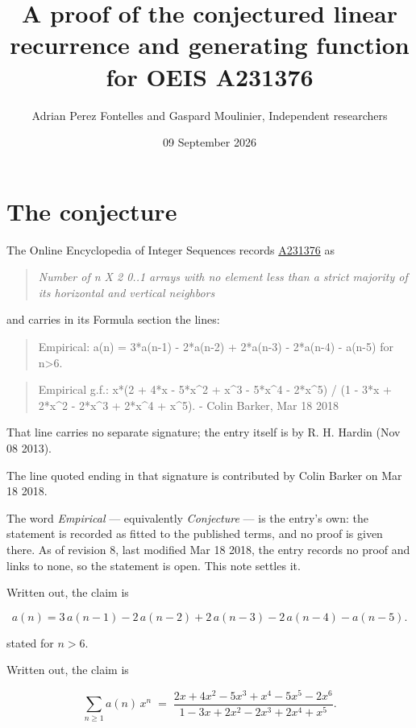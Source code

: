 \documentclass[11pt]{article}
\title{A proof of the conjectured linear recurrence and generating function for OEIS A231376}
\author{Adrian Perez Fontelles and Gaspard Moulinier, Independent researchers}
\date{09 September 2026}
\theoremstyle{definition}
\begin{document}
\maketitle
\section{The conjecture}

The Online Encyclopedia of Integer Sequences records \href{https://oeis.org/A231376}{A231376} as

\begin{quote}\itshape Number of n X 2 0..1 arrays with no element less than a strict majority of its horizontal and vertical neighbors\end{quote}

and carries in its Formula section the lines:

\begin{quote}\ttfamily Empirical: a(n) = 3*a(n-1) - 2*a(n-2) + 2*a(n-3) - 2*a(n-4) - a(n-5) for n>6.\end{quote}

\begin{quote}\ttfamily Empirical g.f.: x*(2 + 4*x - 5*x\textasciicircum{}2 + x\textasciicircum{}3 - 5*x\textasciicircum{}4 - 2*x\textasciicircum{}5) / (1 - 3*x + 2*x\textasciicircum{}2 - 2*x\textasciicircum{}3 + 2*x\textasciicircum{}4 + x\textasciicircum{}5). - Colin Barker, Mar 18 2018\end{quote}

That line carries no separate signature; the entry itself is by R. H. Hardin (Nov 08 2013).

The line quoted ending in that signature is contributed by Colin Barker on Mar 18 2018.

The word {\itshape Empirical} --- equivalently {\itshape Conjecture} --- is the entry's own: the statement is recorded as fitted to the published terms, and no proof is given there. As of revision 8, last modified Mar 18 2018, the entry records no proof and links to none, so the statement is open. This note settles it.

Written out, the claim is

\[a(n) = 3\,a(n-1) - 2\,a(n-2) + 2\,a(n-3) - 2\,a(n-4) - a(n-5).\]

stated for $n > 6$.

Written out, the claim is

\[\sum_{n \ge 1} a(n)\,x^n \;=\; \frac{2x + 4x^{2} - 5x^{3} + x^{4} - 5x^{5} - 2x^{6}}{1 - 3x + 2x^{2} - 2x^{3} + 2x^{4} + x^{5}}.\]
\end{document}
